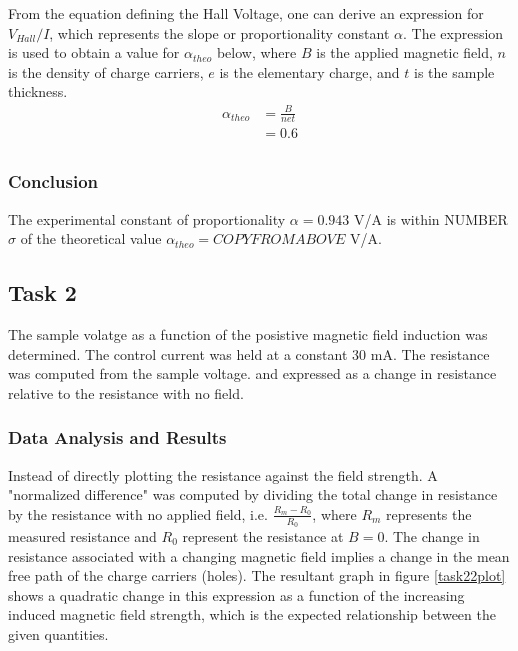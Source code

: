 \documentclass[a4paper]{article}
\begin{document}
\begin{figure}[H]
\centering
\label{task21plot}
\end{figure}

From the equation defining the Hall Voltage, one can derive an expression for $V_{Hall}/I$, which represents the slope or proportionality constant $\alpha$. The expression is used to obtain a value for $\alpha_{theo}$ below, where $B$ is the applied magnetic field, $n$ is the density of charge carriers, $e$ is the elementary charge, and $t$ is the sample thickness.
\begin{align*}
\alpha_{theo} &= \frac{B}{net} \\
			  &= 0.6 \\
\end{align*}

\subsubsection{Conclusion}
The experimental constant of proportionality $\alpha = 0.943 $ V/A is within NUMBER $\sigma$ of the theoretical value $\alpha_{theo} = COPYFROMABOVE$ V/A.

\subsection{Task 2}

\qq The sample volatge as a function of the posistive magnetic field
induction was determined. The control current was held at a constant
30 mA. The resistance was computed from the sample voltage. and expressed as a change in resistance relative to the resistance with no field.

\subsubsection{Data Analysis and Results}
\qq Instead of directly plotting the resistance against the field strength. A "normalized difference" was computed by dividing the total 
change in resistance by the resistance with no applied field, i.e. $\frac{R_m - R_0}{R_0}$, where $R_m$ represents the measured resistance and $R_0$ represent the resistance at $B=0$. The change in resistance associated with a changing magnetic field implies a change in the mean free path of the charge carriers (holes). The resultant graph in figure \ref{task22plot} shows a quadratic change in this expression as a function of the increasing induced magnetic field
strength, which is the expected relationship between the given quantities.
\end{document}
